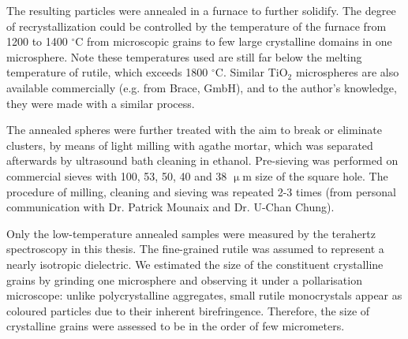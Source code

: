 The resulting particles were annealed in a furnace to further solidify. The degree of recrystallization could be controlled  by the temperature of the furnace from 1200 to 1400 $^{\circ}$C from microscopic grains to few large crystalline domains in one microsphere. Note these temperatures used are still far below the melting temperature of rutile, which exceeds 1800 $^{\circ}$C.
Similar TiO$_{2}$ microspheres are also available commercially (e.g. from Brace, GmbH), and to the author's knowledge, they were made with a similar process.

The annealed spheres were further treated with the aim to break or eliminate clusters, by means of light milling with agathe mortar, which was separated afterwards by ultrasound bath cleaning in ethanol. Pre-sieving was performed on commercial sieves with 100, 53, 50, 40 and 38 $\upmu$m size of the square hole. The procedure of milling, cleaning and sieving was repeated 2-3 times (from personal communication with Dr. Patrick Mounaix and {Dr.} U-Chan Chung).

Only the low-temperature annealed samples were measured by the terahertz spectroscopy in this thesis. The fine-grained rutile was assumed to represent a nearly isotropic dielectric. We estimated the size of the constituent crystalline grains by grinding one microsphere and observing it under a pollarisation microscope: unlike polycrystalline aggregates, small rutile monocrystals appear as coloured particles due to their inherent birefringence. Therefore, the size of crystalline grains were assessed to be in the order of few micrometers.



